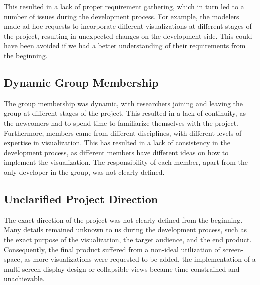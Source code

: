 This resulted in a lack of proper requirement gathering, which in turn led to a number of issues during the development process.
For example, the modelers made ad-hoc requests to incorporate different visualizations at different stages of the project, resulting in unexpected changes on the development side.
This could have been avoided if we had a better understanding of their requirements from the beginning.

\subsection{Dynamic Group Membership}

The group membership was dynamic, with researchers joining and leaving the group at different stages of the project.
This resulted in a lack of continuity, as the newcomers had to spend time to familiarize themselves with the project.
Furthermore, members came from different disciplines, with different levels of expertise in visualization.
This has resulted in a lack of consistency in the development process, as different members have different ideas on how to implement the visualization.
The responsibility of each member, apart from the only developer in the group, was not clearly defined.

\subsection{Unclarified Project Direction}

The exact direction of the project was not clearly defined from the beginning.
Many details remained unknown to us during the development process, such as the exact purpose of the visualization, the target audience, and the end product. 
Consequently, the final product suffered from a non-ideal utilization of screen-space, as more visualizations were requested to be added, the implementation of a multi-screen display design or collapsible views became time-constrained and unachievable.
